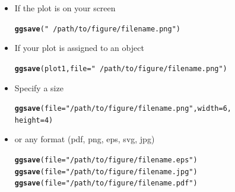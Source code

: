 \documentclass{beamer}\usepackage{graphicx, color}
\makeatletter
\newcommand{\hlfunctioncall}[1]{\textcolor[rgb]{0.501960784313725,0,0.329411764705882}{\textbf{#1}}}%
\newcommand{\hlstring}[1]{\textcolor[rgb]{0.6,0.6,1}{#1}}%
\newenvironment{kframe}{%
 \def\at@end@of@kframe{}%
 \ifinner\ifhmode%
  \def\at@end@of@kframe{\end{minipage}}%
  \begin{minipage}{\columnwidth}%
 \fi\fi%
 \def\FrameCommand##1{\hskip\@totalleftmargin \hskip-\fboxsep
 \colorbox{shadecolor}{##1}\hskip-\fboxsep
     \hskip-\linewidth \hskip-\@totalleftmargin \hskip\columnwidth}%
 \MakeFramed {\advance\hsize-\width
   \@totalleftmargin\z@ \linewidth\hsize
   \@setminipage}}%
 {\par\unskip\endMakeFramed%
 \at@end@of@kframe}
\newenvironment{knitrout}{}{} %
\makeatother
\begin{document}
\begin{frame}[fragile]
\begin{itemize}
\item If the plot is on your screen
\begin{knitrout}\footnotesize
{}\color{fgcolor}\begin{kframe}
\begin{alltt}
\hlfunctioncall{ggsave}(\hlstring{"~/path/to/figure/filename.png"})
\end{alltt}
\end{kframe}
\end{knitrout}

\item If your plot is assigned to an object
\begin{knitrout}\footnotesize
{}\color{fgcolor}\begin{kframe}
\begin{alltt}
\hlfunctioncall{ggsave}(plot1, file = \hlstring{"~/path/to/figure/filename.png"})
\end{alltt}
\end{kframe}
\end{knitrout}


\item Specify a size
\begin{knitrout}\footnotesize
{}\color{fgcolor}\begin{kframe}
\begin{alltt}
\hlfunctioncall{ggsave}(file = \hlstring{"/path/to/figure/filename.png"}, width = 6,
height =4)
\end{alltt}
\end{kframe}
\end{knitrout}

\item or any format (pdf, png, eps, svg, jpg)
\begin{knitrout}\footnotesize
{}\color{fgcolor}\begin{kframe}
\begin{alltt}
\hlfunctioncall{ggsave}(file = \hlstring{"/path/to/figure/filename.eps"})
\hlfunctioncall{ggsave}(file = \hlstring{"/path/to/figure/filename.jpg"})
\hlfunctioncall{ggsave}(file = \hlstring{"/path/to/figure/filename.pdf"})
\end{alltt}
\end{kframe}
\end{knitrout}

\end{itemize}
\end{frame}
\end{document}
